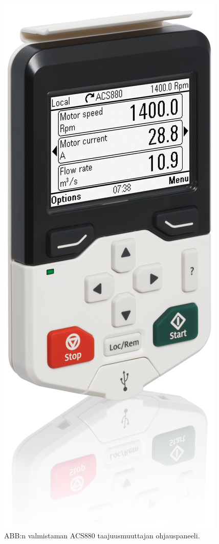 \documentclass[finnish,12pt,a4paper,pdftex,elec,utf8]{aaltothesis}
\begin{document}
\begin{figure}[H]
	\begin{center}
	\includegraphics[scale=0.08]{acs880panel}
	\end{center}
	\caption{ABB:n valmistaman ACS880 taajuusmuuttajan ohjauspaneeli.
		\cite{acs880panel}}
	\label{fig:acs880panel}
\end{figure}
\end{document}
